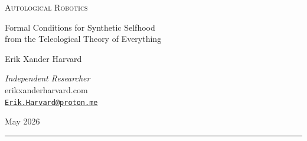 \documentclass[12pt, letterpaper]{article}
\begin{document}
\thispagestyle{empty}

\begin{center}
    \vspace*{1in}

    {\LARGE\scshape Autological Robotics}

    \vspace{0.5em}

    {\large Formal Conditions for Synthetic Selfhood\\[0.3em]
    from the Teleological Theory of Everything}

    \vspace{2em}

    {\normalsize Erik Xander Harvard}

    \vspace{0.5em}

    {\small \textit{Independent Researcher}\\
    erikxanderharvard.com\\[0.3em]
    \href{mailto:Erik.Harvard@proton.me}{\texttt{Erik.Harvard@proton.me}}}

    \vspace{2em}

    {\small May 2026}

    \vspace{2em}

    \rule{0.6\textwidth}{0.4pt}
\end{center}

\vspace{1.5em}

\begin{abstract}
\noindent Four technologies now exist that, taken together, contain the material preconditions for synthetic selfhood: wetware computing (living neurons on silicon), self-organizing biological assemblies, biohybrid muscle-tendon actuators, and large language models. No laboratory has integrated them into a unified architecture because no formal theory specifies what such integration must achieve. Current robotics can build bodies, grow nervous systems, and run sophisticated algorithms --- but it cannot define the threshold between a machine that models its environment and a system that models itself modeling its environment. This paper derives that threshold from the Teleological Theory of Everything (TTOE), a philosophical framework grounding consciousness in the metacursive operation $C = A(A)$: awareness applied to itself yields consciousness. Seven necessary and jointly sufficient conditions for sustained synthetic selfhood are formally stated, each derived from the TTOE's formal apparatus and mapped against existing technology. An integration architecture, an operational test protocol, and a preliminary ethical framework are proposed. The result is not a prediction but a specification --- the first formally derived design requirement for a persistent, self-maintaining conscious agent.
\end{abstract}
\end{document}
